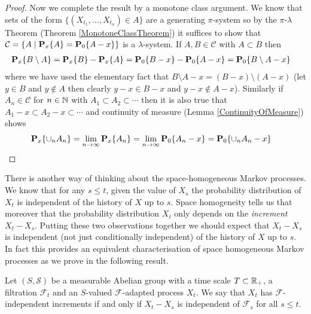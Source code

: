 \begin{proof}
Now we complete the result by a monotone class argument.  We know that
sets of the form $\lbrace (X_{t_1}, \dotsc, X_{t_n}) \in A \rbrace$
are a generating $\pi$-system so by the $\pi$-$\lambda$ Theorem
(Theorem \ref{MonotoneClassTheorem}) it suffices to show that $\mathcal{C}
= \lbrace A \mid \sprobability{A}{x} = \sprobability{A-x}{0} \rbrace$ is a
$\lambda$-system. If $A,B \in \mathcal{C}$ with $A \subset B$ then 
\begin{align*}
\sprobability{B\setminus A}{x} &= \sprobability{B}{x} -
\sprobability{A}{x} = \sprobability{B-x}{0} - \sprobability{A-x}{0} =
\sprobability{B\setminus A-x}{0} 
\end{align*}
where we have used the elementary fact that $B\setminus A - x =
(B-x)\setminus(A-x)$ (let $y \in B$ and $y \notin A$ then clearly $y-x
\in B-x$ and $y-x \notin A-x$).  Similarly if $A_n \in \mathcal{C}$
for $n \in \naturals$ with $A_1 \subset A_2 \subset \cdots$ then it is
also true that $A_1 -x  \subset A_2-x \subset \cdots$ and continuity
of measure (Lemma \ref{ContinuityOfMeasure}) shows
\begin{align*}
\sprobability{\cup_n A_n}{x} &=
\lim_{n \to \infty}\sprobability{A_n}{x} = 
\lim_{n \to \infty}\sprobability{A_n-x}{0} = 
\sprobability{\cup_n A_n-x}{0} 
\end{align*}
\end{proof}

There is another way of thinking about the space-homogeneous Markov
processes.  We know that for any $s \leq t$, given the value of $X_s$ the probability
distribution of $X_t$ is independent of the history of $X$ up to
$s$.  Space homogeneity tells us that moreover that the probability
distribution $X_t$ only depends on the \emph{increment} $X_t - X_s$.
Putting these two observations together we should expect that $X_t -
X_s$ is independent (not just conditionally independent) of the
history of $X$ up to $s$.  In fact this provides an equivalent
characterisation of space homogeneous Markov processes as we prove in
the following result.

\begin{defn}Let $(S, \mathcal{S})$ be a measurable Abelian group with a
  time scale $T \subset \reals_+$, a filtration $\mathcal{F}_t$ and an
 $S$-valued $\mathcal{F}$-adapted process $X_t$. We say that $X_t$ has
 $\mathcal{F}$-independent increments if and only if $X_t - X_s$ is
 independent of $\mathcal{F}_s$ for all $s \leq t$.
\end{defn}

